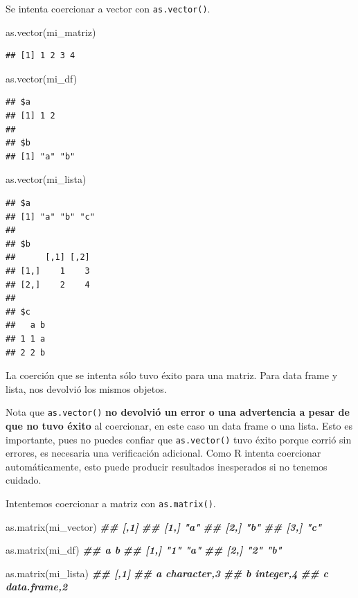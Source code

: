 \documentclass[
]{book}
\newenvironment{Shaded}{\begin{snugshade}}{\end{snugshade}}
\newcommand{\DocumentationTok}[1]{\textcolor[rgb]{0.56,0.35,0.01}{\textbf{\textit{#1}}}}
\newcommand{\FunctionTok}[1]{\textcolor[rgb]{0.00,0.00,0.00}{#1}}
\newcommand{\NormalTok}[1]{#1}
\begin{document}
Se intenta coercionar a vector con \texttt{as.vector()}.

\begin{Shaded}
\begin{Highlighting}[]
\FunctionTok{as.vector}\NormalTok{(mi\_matriz)}
\end{Highlighting}
\end{Shaded}

\begin{verbatim}
## [1] 1 2 3 4
\end{verbatim}

\begin{Shaded}
\begin{Highlighting}[]
\FunctionTok{as.vector}\NormalTok{(mi\_df)}
\end{Highlighting}
\end{Shaded}

\begin{verbatim}
## $a
## [1] 1 2
## 
## $b
## [1] "a" "b"
\end{verbatim}

\begin{Shaded}
\begin{Highlighting}[]
\FunctionTok{as.vector}\NormalTok{(mi\_lista)}
\end{Highlighting}
\end{Shaded}

\begin{verbatim}
## $a
## [1] "a" "b" "c"
## 
## $b
##      [,1] [,2]
## [1,]    1    3
## [2,]    2    4
## 
## $c
##   a b
## 1 1 a
## 2 2 b
\end{verbatim}

La coerción que se intenta sólo tuvo éxito para una matriz. Para data frame y lista, nos devolvió los mismos objetos.

Nota que \texttt{as.vector()} \textbf{no devolvió un error o una advertencia a pesar de que no tuvo éxito} al coercionar, en este caso un data frame o una lista. Esto es importante, pues no puedes confiar que \texttt{as.vector()} tuvo éxito porque corrió sin errores, es necesaria una verificación adicional. Como R intenta coercionar automáticamente, esto puede producir resultados inesperados si no tenemos cuidado.

Intentemos coercionar a matriz con \texttt{as.matrix()}.

\begin{Shaded}
\begin{Highlighting}[]
\FunctionTok{as.matrix}\NormalTok{(mi\_vector)}
\DocumentationTok{\#\#      [,1]}
\DocumentationTok{\#\# [1,] "a" }
\DocumentationTok{\#\# [2,] "b" }
\DocumentationTok{\#\# [3,] "c"}

\FunctionTok{as.matrix}\NormalTok{(mi\_df)}
\DocumentationTok{\#\#      a   b  }
\DocumentationTok{\#\# [1,] "1" "a"}
\DocumentationTok{\#\# [2,] "2" "b"}

\FunctionTok{as.matrix}\NormalTok{(mi\_lista)}
\DocumentationTok{\#\#   [,1]        }
\DocumentationTok{\#\# a character,3 }
\DocumentationTok{\#\# b integer,4   }
\DocumentationTok{\#\# c data.frame,2}
\end{Highlighting}
\end{Shaded}
\end{document}

